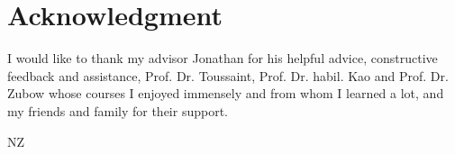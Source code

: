 
\cleardoublepage
{}
\section*{Acknowledgment}

I would like to thank my advisor Jonathan for his helpful advice, constructive feedback and assistance, Prof. Dr. Toussaint, Prof. Dr. habil. Kao and Prof. Dr. Zubow whose courses I enjoyed immensely and from whom I learned a lot, and my friends and family for their support.

\nocite{fan2020,learningToSchedule,scarl,toussaint}


\begin{flushright}
NZ\\[1pc]
\end{flushright}
